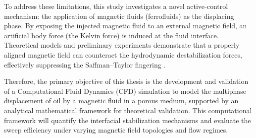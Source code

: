 To address these limitations, this study investigates a novel active-control mechanism: the application of magnetic fluids (ferrofluids) as the displacing phase. By exposing the injected magnetic fluid to an external magnetic field, an artificial body force (the Kelvin force) is induced at the fluid interface. Theoretical models and preliminary experiments demonstrate that a properly aligned magnetic field can counteract the hydrodynamic destabilization forces, effectively suppressing the Saffman--Taylor fingering \cite{jackson1993hydrodynamics, miranda1998radial}.

Therefore, the primary objective of this thesis is the development and validation of a Computational Fluid Dynamics (CFD) simulation to model the multiphase displacement of oil by a magnetic fluid in a porous medium, supported by an analytical mathematical framework for theoretical validation. This computational framework will quantify the interfacial stabilization mechanisms and evaluate the sweep efficiency under varying magnetic field topologies and flow regimes.